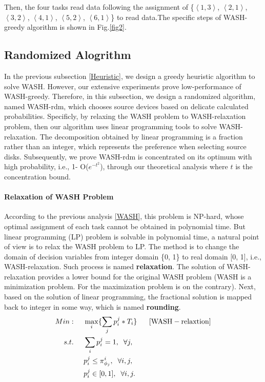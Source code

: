 \documentclass[conference]{IEEEtran}
\begin{document}
Then, the four tasks read data following the assignment of \{$\left \langle 1, 3\right \rangle$, $\left \langle 2, 1\right \rangle$,  $\left \langle 3, 2\right \rangle$, $\left \langle 4, 1\right \rangle$, $\left \langle 5, 2\right \rangle$, $\left \langle 6, 1\right \rangle$\} to read data.The specific steps of WASH-greedy algorithm is shown in Fig.\ref{fig2}.

\subsection{Randomized Alogrithm}\label{Randomized}

In the previous subsection \ref{Heuristic}, we design a greedy heuristic algorithm to solve WASH. However, our extensive experiments prove low-performance of WASH-greedy. Therefore, in this subsection, we design a randomized algorithm, named WASH-rdm, which chooses source devices based on delicate calculated probabilities. Specificly, by relaxing the WASH problem to WASH-relaxation problem, then our algorithm uses linear programming tools to solve WASH-relaxation. The decomposition obtained by linear programming is a fraction rather than an integer, which represents the preference when selecting source disks. Subsequently, we prove WASH-rdm is concentrated on its optimum with high probability, i.e., 1- O($e^{-t^2}$), through our theoretical analysis where $t$ is the concentration bound.

\paragraph{\textbf{Relaxation of WASH Problem}} According to the previous analysis \ref{WASH}, this problem is NP-hard, whose optimal assignment of each task cannot be obtained in polynomial time. But linear programming (LP) problem is solvable in polynomial time, a natural point of view is to relax the WASH problem to LP. The method is to change the domain of decision variables from integer domain \{0, 1\} to real domain [0, 1], i.e., WASH-relaxation. Such process is named \textbf{relaxation}. The solution of WASH-relaxation provides a lower bound for the original WASH problem (WASH is a minimization problem. For the maximization problem is on the contrary). Next, based on the solution of linear programming, the fractional solution is mapped back to integer in some way, which is named \textbf{rounding}. 
 \begin{align}
 Min:&\;\;\;\;\;\max\limits_{i}\{\sum_{j}p_i^j*T_i\}\;\;\;\;\;\;[\rm{WASH-relaxtion}]\nonumber\\
 s.t. 
 &\;\;\;\;\;\sum_{i}p_i^j = 1,\;\;\forall j,\nonumber\\
 &\;\;\;\;\;p_i^j \leq \pi_{\phi_j}^{i},\;\;\forall i,j,\nonumber\\
 &\;\;\;\;\;p_i^j \in[0, 1],\;\;\forall i,j.\nonumber
 \end{align}
\end{document}
